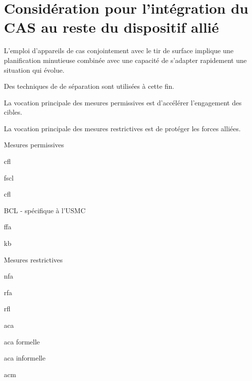 \section{Considération pour l'intégration du CAS au reste du dispositif allié}

L'emploi d'appareils de \gls{cas} conjointement avec le tir de surface implique une planification minutieuse combinée avec une capacité de s'adapter rapidement une situation qui évolue.

Des techniques de de séparation sont utilisées à cette fin.

\begin{e1}
	\item La vocation principale des mesures permissives est d'accélérer l'engagement des cibles.
	\item La vocation principale des mesures restrictives est de protéger les forces alliées.
	\begin{e2}
		\item Mesures permissives
		\begin{e3}
			\item \acrfull{cfl}
			\item \acrfull{fscl}
			\item \acrfull{cfl}
			\item BCL - spécifique à l'USMC
			\item \acrfull{ffa}
			\item \acrfull{kb}
		\end{e3}
		\item Mesures restrictives
		\begin{e3}
			\item \acrfull{nfa}
			\item \acrfull{rfa}
			\item \acrfull{rfl}
			\item \acrfull{aca}
			\begin{e4}
				\item \gls{aca} formelle
				\item \gls{aca} informelle
			\end{e4}
		\end{e3}
		\item \acrfull{acm}	

\end{e2}
\end{e1}
